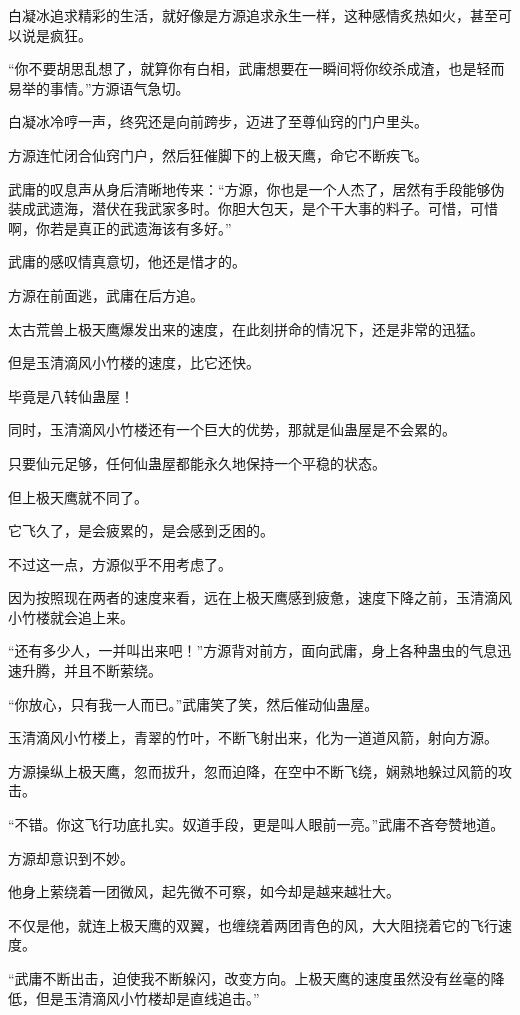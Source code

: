 \begin{this_body}
白凝冰追求精彩的生活，就好像是方源追求永生一样，这种感情炙热如火，甚至可以说是疯狂。

“你不要胡思乱想了，就算你有白相，武庸想要在一瞬间将你绞杀成渣，也是轻而易举的事情。”方源语气急切。

白凝冰冷哼一声，终究还是向前跨步，迈进了至尊仙窍的门户里头。

方源连忙闭合仙窍门户，然后狂催脚下的上极天鹰，命它不断疾飞。

武庸的叹息声从身后清晰地传来：“方源，你也是一个人杰了，居然有手段能够伪装成武遗海，潜伏在我武家多时。你胆大包天，是个干大事的料子。可惜，可惜啊，你若是真正的武遗海该有多好。”

武庸的感叹情真意切，他还是惜才的。

方源在前面逃，武庸在后方追。

太古荒兽上极天鹰爆发出来的速度，在此刻拼命的情况下，还是非常的迅猛。

但是玉清滴风小竹楼的速度，比它还快。

毕竟是八转仙蛊屋！

同时，玉清滴风小竹楼还有一个巨大的优势，那就是仙蛊屋是不会累的。

只要仙元足够，任何仙蛊屋都能永久地保持一个平稳的状态。

但上极天鹰就不同了。

它飞久了，是会疲累的，是会感到乏困的。

不过这一点，方源似乎不用考虑了。

因为按照现在两者的速度来看，远在上极天鹰感到疲惫，速度下降之前，玉清滴风小竹楼就会追上来。

“还有多少人，一并叫出来吧！”方源背对前方，面向武庸，身上各种蛊虫的气息迅速升腾，并且不断萦绕。

“你放心，只有我一人而已。”武庸笑了笑，然后催动仙蛊屋。

玉清滴风小竹楼上，青翠的竹叶，不断飞射出来，化为一道道风箭，射向方源。

方源操纵上极天鹰，忽而拔升，忽而迫降，在空中不断飞绕，娴熟地躲过风箭的攻击。

“不错。你这飞行功底扎实。奴道手段，更是叫人眼前一亮。”武庸不吝夸赞地道。

方源却意识到不妙。

他身上萦绕着一团微风，起先微不可察，如今却是越来越壮大。

不仅是他，就连上极天鹰的双翼，也缠绕着两团青色的风，大大阻挠着它的飞行速度。

“武庸不断出击，迫使我不断躲闪，改变方向。上极天鹰的速度虽然没有丝毫的降低，但是玉清滴风小竹楼却是直线追击。”


\end{this_body}
